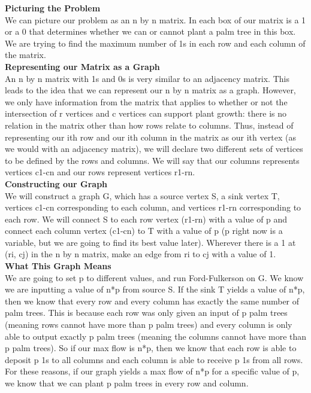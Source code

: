 \documentclass[11pt, solution, letterpaper]{format}
\begin{document}
\textbf{Picturing the Problem}\\
We can picture our problem as an n by n matrix. In each box of our matrix is a 1 or a 0 that determines whether we can or cannot plant a palm tree in this box. We are trying to find the maximum number of 1s in each row and each column of the matrix. \\

\textbf{Representing our Matrix as a Graph}\\
An n by n matrix with 1s and 0s is very similar to an adjacency matrix. This leads to the idea that we can represent our n by n matrix as a graph. However, we only have information from the matrix that applies to whether or not the intersection of r vertices and c vertices can support plant growth: there is no relation in the matrix other than how rows relate to columns. Thus, instead of representing our ith row and our ith column in the matrix as our ith vertex (as we would with an adjacency matrix), we will declare two different sets of vertices to be defined by the rows and columns. We will say that our columns represents vertices c1-cn and our rows represent vertices r1-rn.  \\

\textbf{Constructing our Graph}\\
We will construct a graph G, which has a source vertex S, a sink vertex T, vertices c1-cn corresponding to each column, and vertices r1-rn corresponding to each row. We will connect S to each row vertex (r1-rn) with a value of p and connect each column vertex (c1-cn) to T with a value of p (p right now is a variable, but we are going to find its best value later). Wherever there is a 1 at (ri, cj) in the n by n matrix, make an edge from ri to cj with a value of 1.\\

\textbf{What This Graph Means}\\
We are going to set p to different values, and run Ford-Fulkerson on G. We know we are inputting a value of n*p from source S. If the sink T yields a value of n*p, then we know  that every row and every column has exactly the same number of palm trees. This is because each row was only given an input of p palm trees (meaning rows cannot have more than p palm trees) and every column is only able to output exactly p palm trees (meaning the columns cannot have more than p palm trees). So if our max flow is n*p, then we know that each row is able to deposit p 1s to all columns and each column is able to receive p 1s from all rows. For these reasons, if our graph yields a max flow of n*p for a specific value of p, we know that we can plant p palm trees in every row and column.\\
\end{document}
